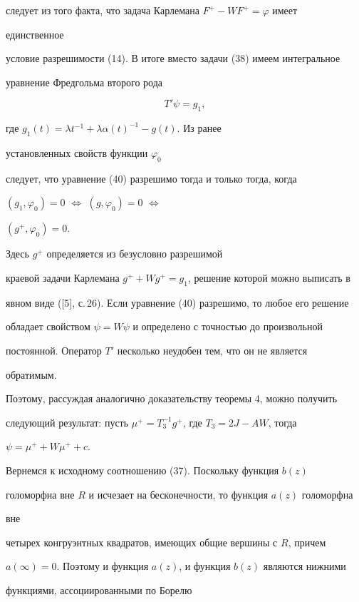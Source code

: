 следует из того факта, что задача Карлемана $F^+-WF^+=\varphi$ имеет 


единственное 


условие разрешимости (14). В итоге вместо задачи (38) имеем интегральное 


уравнение Фредгольма второго рода 


\begin{equation} 


T'\psi=g_1, 


\end{equation} 


где $g_1(t)=\lambda t^{-1}+\lambda\alpha(t)^{-1}-g(t)$. Из ранее 


установленных свойств функции $\varphi_0$ 


следует, что уравнение (40) разрешимо тогда и только тогда, когда 


$(g_1,\varphi_0)=0$ $\Leftrightarrow$ $(g,\varphi_0)=0$ $\Leftrightarrow$ 


$(g^+,\varphi_0)=0$. 


Здесь $g^+$ определяется из безусловно разрешимой 


краевой задачи Карлемана $g^++Wg^+=g_1$, решение которой можно выписать в 


явном виде ([5], с.\,26). Если уравнение (40) разрешимо, то любое его решение 


обладает свойством $\psi=W\psi$ и определено с точностью до произвольной 


постоянной. Оператор $T'$ несколько неудобен тем, что он не является 


обратимым. 


Поэтому, рассуждая аналогично доказательству теоремы 4, можно получить 


следующий результат: пусть $\mu^+=T^{-1}_3g^+$, где $T_3=2J-AW$, тогда 


$\psi=\mu^++W\mu^++c$. 


 


Вернемся к исходному соотношению (37). Поскольку функция $b(z)$ 


голоморфна вне $R$ и исчезает на бесконечности, то функция $a(z)$ голоморфна 


вне 


четырех конгруэнтных квадратов, имеющих общие вершины с $R$, причем 


$a(\infty)=0$. Поэтому и функция $a(z)$, и функция $b(z)$ являются нижними 


функциями, ассоциированными по Борелю 


